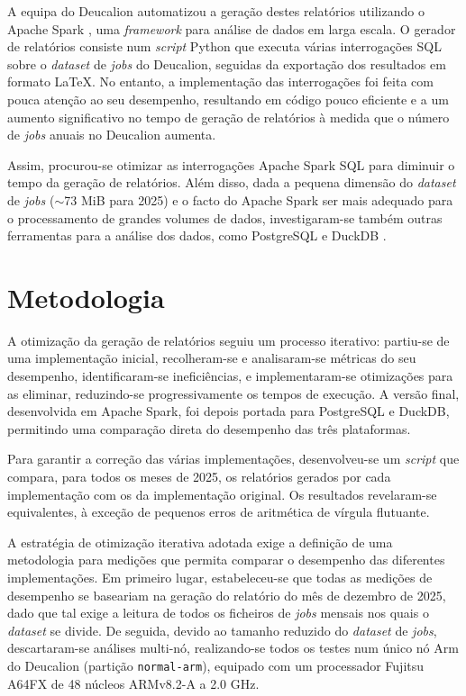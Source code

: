 \documentclass[11pt, a4paper]{article}
\begin{document}
A equipa do Deucalion automatizou a geração destes relatórios utilizando o Apache Spark
\cite{apache-spark}, uma \emph{framework} para análise de dados em larga escala. O gerador de
relatórios consiste num \emph{script} Python que executa várias interrogações SQL sobre o
\emph{dataset} de \emph{jobs} do Deucalion, seguidas da exportação dos resultados em formato LaTeX.
No entanto, a implementação das interrogações foi feita com pouca atenção ao seu desempenho,
resultando em código pouco eficiente e a um aumento significativo no tempo de geração de relatórios
à medida que o número de \emph{jobs} anuais no Deucalion aumenta.

Assim, procurou-se otimizar as interrogações Apache Spark SQL para diminuir o tempo da geração de
relatórios. Além disso, dada a pequena dimensão do \emph{dataset} de \emph{jobs} ($\sim$73 MiB para
2025) e o facto do Apache Spark ser mais adequado para o processamento de grandes volumes de dados,
investigaram-se também outras ferramentas para a análise dos dados, como PostgreSQL
\cite{postgresql} e DuckDB \cite{duckdb}.

\section{Metodologia} %

A otimização da geração de relatórios seguiu um processo iterativo: partiu-se de uma implementação
inicial, recolheram-se e analisaram-se métricas do seu desempenho, identificaram-se ineficiências, e
implementaram-se otimizações para as eliminar, reduzindo-se progressivamente os tempos de execução.
A versão final, desenvolvida em Apache Spark, foi depois portada para PostgreSQL e DuckDB,
permitindo uma comparação direta do desempenho das três plataformas.

Para garantir a correção das várias implementações, desenvolveu-se um \emph{script} que compara,
para todos os meses de 2025, os relatórios gerados por cada implementação com os da implementação
original. Os resultados revelaram-se equivalentes, à exceção de pequenos erros de aritmética de
vírgula flutuante.

A estratégia de otimização iterativa adotada exige a definição de uma metodologia para medições que
permita comparar o desempenho das diferentes implementações. Em primeiro lugar, estabeleceu-se que
todas as medições de desempenho se baseariam na geração do relatório do mês de dezembro de 2025,
dado que tal exige a leitura de todos os ficheiros de \emph{jobs} mensais nos quais o \emph{dataset}
se divide. De seguida, devido ao tamanho reduzido do \emph{dataset} de \emph{jobs}, descartaram-se
análises multi-nó, realizando-se todos os testes num único nó Arm do Deucalion (partição
\texttt{normal-arm}), equipado com um processador Fujitsu A64FX de 48 núcleos ARMv8.2-A a 2.0 GHz.
\end{document}
